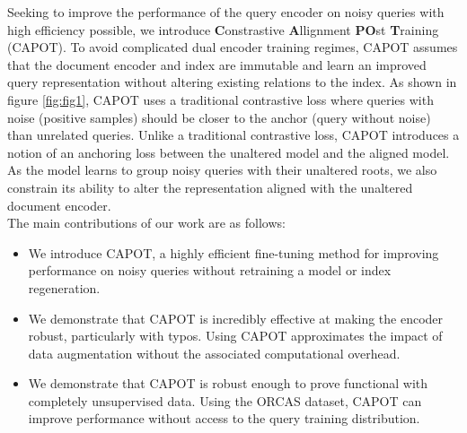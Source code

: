 Seeking to improve the performance of the query encoder on noisy queries with high efficiency possible, we introduce \textbf{C}onstrastive \textbf{A}llignment \textbf{PO}st \textbf{T}raining (CAPOT). To avoid complicated dual encoder training regimes, CAPOT assumes that the document encoder and index are immutable and learn an improved query representation without altering existing relations to the index. As shown in figure \ref{fig:fig1}, CAPOT uses a traditional contrastive loss \cite{Schroff2015FaceNetAU} where queries with noise (positive samples) should be closer to the anchor (query without noise) than unrelated queries. Unlike a traditional contrastive loss, CAPOT introduces a notion of an anchoring loss between the unaltered model and the aligned model. As the model learns to group noisy queries with their unaltered roots, we also constrain its ability to alter the representation aligned with the unaltered document encoder.\\
The main contributions of our work are as follows:
\begin{itemize}
\item We introduce CAPOT, a highly efficient fine-tuning method for improving performance on noisy queries without retraining a model or index regeneration. 
\item We demonstrate that CAPOT is incredibly effective at making the encoder robust, particularly with typos. Using CAPOT approximates the impact of data augmentation without the associated computational overhead.
\item We demonstrate that CAPOT is robust enough to prove functional with completely unsupervised data. Using the ORCAS dataset, CAPOT can improve performance without access to the query training distribution.
\end{itemize}